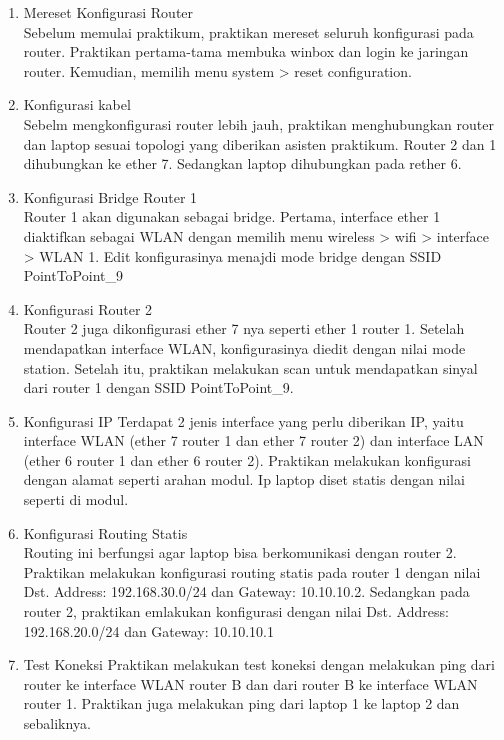 \begin{enumerate}
  \item Mereset Konfigurasi Router \\
  Sebelum memulai praktikum, praktikan mereset seluruh konfigurasi pada router. Praktikan pertama-tama membuka winbox dan login ke jaringan router. Kemudian, memilih menu system > reset configuration.
  \item Konfigurasi kabel\\
  Sebelm mengkonfigurasi router lebih jauh, praktikan menghubungkan router dan laptop sesuai topologi yang diberikan asisten praktikum. Router 2 dan 1 dihubungkan ke ether 7. Sedangkan laptop dihubungkan pada rether 6. 
  \item Konfigurasi Bridge Router 1\\
  Router 1 akan digunakan sebagai bridge. Pertama, interface ether 1 diaktifkan sebagai WLAN dengan memilih menu wireless > wifi > interface > WLAN 1. Edit konfigurasinya menajdi mode bridge dengan SSID PointToPoint\_9
  \item Konfigurasi Router 2 \\
  Router 2 juga dikonfigurasi ether 7 nya seperti ether 1 router 1. Setelah mendapatkan interface WLAN, konfigurasinya diedit dengan nilai mode station. Setelah itu, praktikan melakukan scan untuk mendapatkan sinyal dari router 1 dengan SSID PointToPoint\_9.
  \item Konfigurasi IP
  Terdapat 2 jenis interface yang perlu diberikan IP, yaitu interface WLAN (ether 7 router 1 dan ether 7 router 2) dan interface LAN (ether 6 router 1 dan ether 6 router 2). Praktikan melakukan konfigurasi dengan alamat seperti arahan modul. Ip laptop diset statis dengan nilai seperti di modul.
  \item Konfigurasi Routing Statis \\
  Routing ini berfungsi agar laptop bisa berkomunikasi dengan router 2. Praktikan melakukan konfigurasi routing statis pada router 1 dengan nilai Dst. Address: 192.168.30.0/24 dan Gateway: 10.10.10.2. Sedangkan pada router 2, praktikan emlakukan konfigurasi dengan nilai Dst. Address: 192.168.20.0/24 dan Gateway: 10.10.10.1
  \item Test Koneksi
  Praktikan melakukan test koneksi dengan melakukan ping dari router ke interface WLAN router B dan dari router B ke interface WLAN router 1. Praktikan juga melakukan ping dari laptop 1 ke laptop 2 dan sebaliknya.
\end{enumerate}


